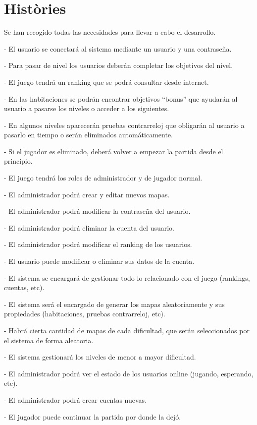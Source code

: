 \section{Històries}

Se han recogido todas las necesidades para llevar a cabo el desarrollo.

-	El usuario se conectará al sistema mediante un usuario y una contraseña.

-	Para pasar de nivel los usuarios deberán completar los objetivos del nivel.

-	El juego tendrá un ranking que se podrá consultar desde internet.

-	En las habitaciones se podrán encontrar objetivos “bonus” que ayudarán al usuario a pasarse los niveles o acceder a los siguientes.

-	En algunos niveles aparecerán pruebas contrarreloj que obligarán al usuario a pasarlo en tiempo o serán eliminados automáticamente.

-	Si el jugador es eliminado, deberá volver a empezar la partida desde el principio.

-	El juego tendrá los roles de administrador y de jugador normal.

-	El administrador podrá crear y editar nuevos mapas.

-	El administrador podrá modificar la contraseña del usuario.

-	El administrador podrá eliminar la cuenta del usuario.

-	El administrador podrá modificar el ranking de los usuarios.

-	El usuario puede modificar o eliminar sus datos de la cuenta.

-	El sistema se encargará de gestionar todo lo relacionado con el juego (rankings, cuentas, etc).

-	El sistema será el encargado de generar los mapas aleatoriamente y sus propiedades (habitaciones, pruebas contrarreloj, etc).

-	Habrá cierta cantidad de mapas de cada dificultad, que serán seleccionados por el sistema de forma aleatoria.

-	El sistema gestionará los niveles de menor a mayor dificultad.

-	El administrador podrá ver el estado de los usuarios online (jugando, esperando, etc).

-	El administrador podrá crear cuentas nuevas.

-	El jugador puede continuar la partida por donde la dejó.

